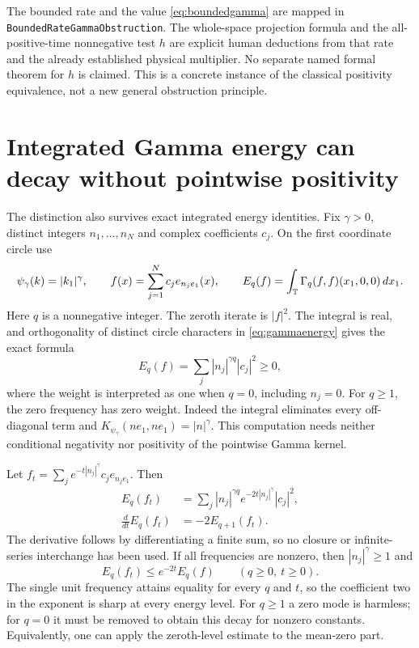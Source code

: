 \documentclass[11pt]{article}
\theoremstyle{remark}\newtheorem{remark}[theorem]{Remark}
\newcommand{\code}[1]{{\small\nolinkurl{#1}}}
\begin{document}
The bounded rate and the value \eqref{eq:boundedgamma} are mapped
in \code{BoundedRateGammaObstruction}. The whole-space projection
formula and the all-positive-time nonnegative test $h$ are explicit
human deductions from that rate and the already established physical
multiplier. No separate named formal theorem for $h$ is claimed.
This is a concrete instance of the classical positivity equivalence,
not a new general obstruction principle.

\section{Integrated Gamma energy can decay without pointwise positivity}
The distinction also survives exact integrated energy identities.
Fix $\gamma>0$, distinct integers $n_1,\ldots,n_N$ and complex
coefficients $c_j$. On the first coordinate circle use
\[
 \psi_\gamma(k)=|k_1|^\gamma,\qquad
 f(x)=\sum_{j=1}^N c_j e_{n_j e_1}(x),\qquad
 E_q(f)=\int_{\mathbb T}\Gamma_q(f,f)(x_1,0,0)\,dx_1.
\]
Here $q$ is a nonnegative integer. The zeroth iterate is $|f|^2$.
The integral is real, and orthogonality of distinct circle characters
in \eqref{eq:gammaenergy} gives the exact formula
\begin{equation}\label{eq:integratedgamma}
 E_q(f)=\sum_j |n_j|^{\gamma q}|c_j|^2\geq0,
\end{equation}
where the weight is interpreted as one when $q=0$, including
$n_j=0$. For $q\geq1$, the zero frequency has zero weight.
Indeed the integral eliminates every off-diagonal term and
$K_{\psi_\gamma}(n e_1,n e_1)=|n|^\gamma$.
This computation needs neither conditional negativity nor positivity
of the pointwise Gamma kernel.

Let $f_t=\sum_j e^{-t|n_j|^\gamma}c_j e_{n_j e_1}$. Then
\begin{align}\label{eq:energydecay}
 E_q(f_t)&=\sum_j |n_j|^{\gamma q}
                 e^{-2t|n_j|^\gamma}|c_j|^2,\\
 \frac{d}{dt}E_q(f_t)&=-2E_{q+1}(f_t).\nonumber
\end{align}
The derivative follows by differentiating a finite sum, so no closure
or infinite-series interchange has been used. If all frequencies
are nonzero, then $|n_j|^\gamma\geq1$ and
\begin{equation}\label{eq:integratedsharpdecay}
 E_q(f_t)\leq e^{-2t}E_q(f)\qquad(q\geq0,\ t\geq0).
\end{equation}
The single unit frequency attains equality for every $q$ and $t$,
so the coefficient two in the exponent is sharp at every energy
level. For $q\geq1$ a zero mode is harmless; for $q=0$ it must be
removed to obtain this decay for nonzero constants. Equivalently,
one can apply the zeroth-level estimate to the mean-zero part.
\end{document}
